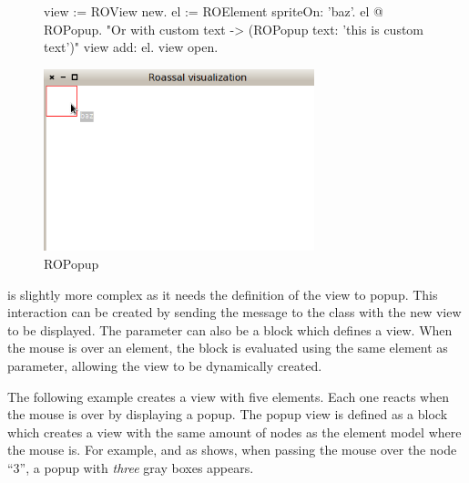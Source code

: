 \documentclass[a4paper,10pt,twoside]{book}
\begin{document}
\begin{figure}[H]
      \begin{minipage}[t]{1\textwidth}
      \vspace{0pt}
     \begin{code}{}
view := ROView new.
el := ROElement spriteOn: 'baz'.
el @ ROPopup. "Or with custom text -> (ROPopup text: 'this is custom text')"
view add: el.
view open.
  \end{code}
   \end{minipage}
   \hfill
   \begin{minipage}[t]{1\textwidth}
	 \vspace{0pt} \raggedright
       \centering
		\includegraphics[width=0.7\textwidth]{popup}
   \end{minipage}
\label{fig:popup}
\caption{ROPopup}
\end{figure} 

 is slightly more complex as it needs the definition of the view to popup. This interaction can be created by sending the  message to the  class with the new view to be displayed. 
The parameter can also be a block which defines a view. When the mouse is over an element, the block is evaluated using the same element as parameter, allowing the view to be dynamically created.

The following example creates a view with five elements. Each one reacts when the mouse is over by displaying a popup. The popup view is defined as a block which creates a view with the same amount of nodes as the element model where the mouse is. For example, and as  shows, when passing the mouse over the node ``3'', a popup with \textit{three} gray boxes appears.
\end{document}
